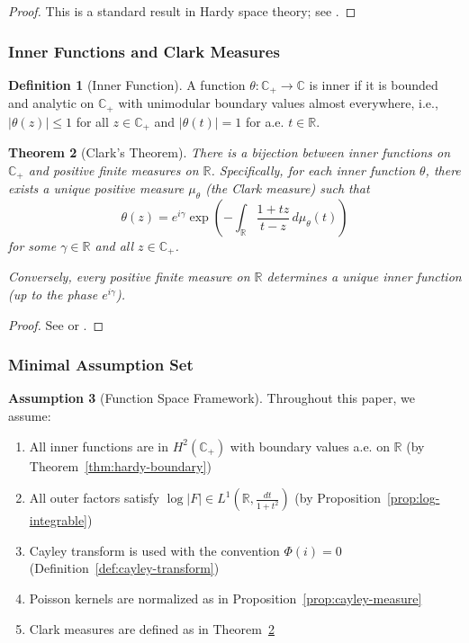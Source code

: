 ﻿\documentclass[12pt,a4paper]{article}
\newtheorem{theorem}{Theorem}[section]
\theoremstyle{definition}
\newtheorem{definition}[theorem]{Definition}
\newtheorem{assumption}[theorem]{Assumption}
\theoremstyle{remark}
\newcommand{\CC}{\mathbb{C}}
\newcommand{\RR}{\mathbb{R}}
\begin{document}
\begin{proof}
This is a standard result in Hardy space theory; see \cite[Thm.~2.11]{Garnett2007}.
\end{proof}

\subsubsection{Inner Functions and Clark Measures}

\begin{definition}[Inner Function]
\label{def:inner-function}
A function $\theta: \CC_+ \to \CC$ is inner if it is bounded and analytic on $\CC_+$ with unimodular boundary values almost everywhere, i.e., $|\theta(z)| \leq 1$ for all $z \in \CC_+$ and $|\theta(t)| = 1$ for a.e. $t \in \RR$.
\end{definition}

\begin{theorem}[Clark's Theorem]
\label{thm:clark}
There is a bijection between inner functions on $\CC_+$ and positive finite measures on $\RR$. Specifically, for each inner function $\theta$, there exists a unique positive measure $\mu_\theta$ (the Clark measure) such that
\[
\theta(z) = e^{i\gamma} \exp\left(-\int_\RR \frac{1 + tz}{t - z} \, d\mu_\theta(t)\right)
\]
for some $\gamma \in \RR$ and all $z \in \CC_+$.

Conversely, every positive finite measure on $\RR$ determines a unique inner function (up to the phase $e^{i\gamma}$).
\end{theorem}

\begin{proof}
See \cite[Thm.~4.1]{Garnett2007} or \cite{Clark1972}.
\end{proof}

\subsubsection{Minimal Assumption Set}

\begin{assumption}[Function Space Framework]
\label{ass:function-space}
Throughout this paper, we assume:
\begin{enumerate}
\item All inner functions are in $H^2(\CC_+)$ with boundary values a.e. on $\RR$ (by Theorem~\ref{thm:hardy-boundary})
\item All outer factors satisfy $\log|F| \in L^1(\RR, \frac{dt}{1 + t^2})$ (by Proposition~\ref{prop:log-integrable})
\item Cayley transform is used with the convention $\Phi(i) = 0$ (Definition~\ref{def:cayley-transform})
\item Poisson kernels are normalized as in Proposition~\ref{prop:cayley-measure}
\item Clark measures are defined as in Theorem~\ref{thm:clark}
\end{enumerate}
\end{assumption}
\end{document}
